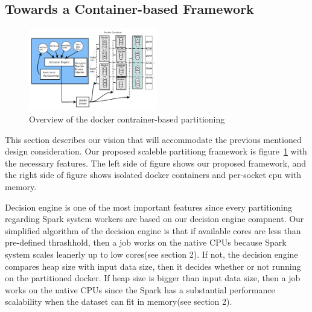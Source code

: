 \fi


\subsection{Towards a Container-based Framework}

\begin{figure}[h]
  \begin{center}
     \includegraphics[width=0.5\textwidth]{fig/jaildocker}
  \end{center}
  \caption{Overview of the docker contrainer-based
  partitioning}
  \label{fig:basic}
\end{figure}

This section describes our vision that will accommodate the previous
mentioned design consideration.
Our proposed scaleble partitiong framework is figure~\ref{fig:basic} with the
necessary features.
The left side of figure shows our proposed framework, and the right side of
figure shows isolated docker containers and per-socket cpu with memory.

Decision engine is one of the most important features
since every partitioning regarding Spark system workers are based
on our decision engine compnent.
Our simplified algorithm of the decision engine is that if available cores are
less than pre-defined thrashhold, then a job works on the native CPUs because
Spark system scales leanerly up to low cores(see section 2).
If not, the decision engine compares heap size with input data size, then
it decides whether or not running on the partitioned docker.
If heap size is bigger than input data size, then a job works on the native CPUs 
since the Spark has a substantial performance scalability when the dataset can
fit in memory(see section 2).

